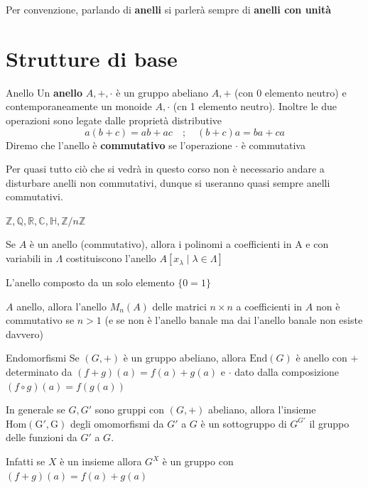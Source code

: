 Per convenzione, parlando di \textbf{anelli} si parlerà sempre di \textbf{anelli
con unità}

\section{Strutture di base}

\begin{definition}{Anello}
    Un \textbf{anello} \(A, +, \cdot \) è un gruppo abeliano \(A, +\) (con 0
    elemento neutro) e
    contemporaneamente un monoide \(A, \cdot \)  (cn 1 elemento neutro).
    Inoltre le due operazioni sono legate dalle proprietà distributive 
    \[
      a{(b + c)} = ab + ac \quad ; \quad {(b + c)}a = ba + ca
    \]
    Diremo che l'anello è \textbf{commutativo} se l'operazione \(\cdot \) è
    commutativa
\end{definition}
Per quasi tutto ciò che si vedrà in questo corso non è necessario andare a
disturbare anelli non commutativi, dunque si useranno quasi sempre anelli
commutativi.
\begin{example}
    \(\mathbb{Z}, \mathbb{Q}, \mathbb{R}, \mathbb{C}, \mathbb{H}, \mathbb{Z} / n \mathbb{Z}\)
\end{example}
\begin{example}
    Se \(A\) è un anello (commutativo), allora i polinomi a coefficienti in A e
    con variabili in \(\Lambda\) costituiscono l'anello \(A[x_{\lambda} \mid
    \lambda \in  \Lambda]\) 
\end{example}
\begin{example}
    L'anello composto da un solo elemento \(\{0 = 1\} \)  
\end{example}
\begin{example}
    \(A\) anello, allora l'anello \(M_{n}{(A)}\) delle matrici \(n \times n\) a
    coefficienti in \(A\) non è commutativo se \(n > 1\) (e se non è l'anello
    banale ma dai l'anello banale non esiste davvero)
\end{example}
\begin{example}{Endomorfismi}
    Se \({(G, +)}\) è un gruppo abeliano, allora \(\mathrm{End}{(G)}\) è anello
    con \(+\) determinato da \({(f + g)}{(a)} = f{(a)} + g{(a)}\) e \(\cdot \)
    dato dalla composizione \({(f \circ g)}{(a)} = f{(g{(a)})}\) 

    In generale se \(G, G'\) sono gruppi con \({(G, +)}\) abeliano, allora l'insieme
    \(\mathrm{Hom {(G', G)}}\) degli omomorfismi da \(G'\) a \(G\)  è un sottogruppo
    di \(G^{G'}\) il gruppo delle funzioni da \(G'\) a \(G\).

    Infatti se \(X\) è un insieme allora \(G^{X}\) è un gruppo con \({(f + g)}{(a)} = f{(a)} + g{(a)}\) 
\end{example}

